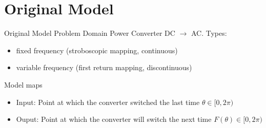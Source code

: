 
\section{Original Model}

\begin{frame}{Original Model Problem Domain}
    Power Converter DC $\to$ AC.
    Types:
    \begin{itemize}
        \item fixed frequency (stroboscopic mapping, continuous)
        \item variable frequency (first return mapping, discontinuous)
              \hspace{2em}
    \end{itemize}

    \pause
    \vspace{2em}
    Model maps
    \begin{itemize}
        \item Input: Point at which the converter switched the last time $\theta \in [0, 2 \pi)$
        \item Ouput: Point at which the converter will switch the next time $F(\theta) \in [0, 2 \pi)$
    \end{itemize}
\end{frame}

